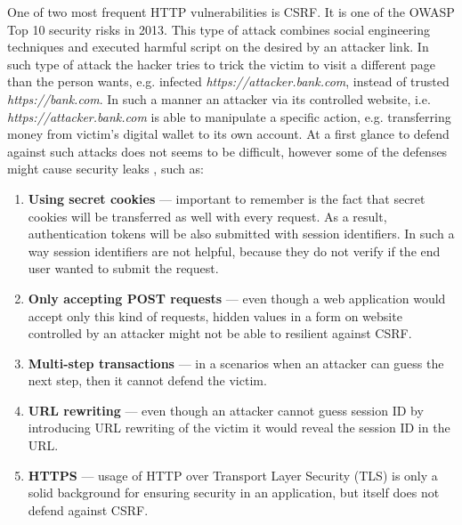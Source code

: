 \documentclass{article} %
\begin{document}
One of two most frequent HTTP vulnerabilities is CSRF. It is one of the OWASP Top 10 security risks in 2013. This type of attack combines social engineering techniques and executed harmful script on the desired by an attacker link. In such type of attack the hacker tries to trick the victim to visit a different page than the person wants, e.g. infected \textit{https://attacker.bank.com}, instead of trusted \textit{https://bank.com}. In such a manner an attacker via its controlled website, i.e. \textit{https://attacker.bank.com} is able to manipulate a specific action, e.g. transferring money from victim's digital wallet to its own account. At a first glance to defend against such attacks does not seems to be difficult, however some of the defenses might cause security leaks \cite{bib:owasp_csrf}, such as:
\begin{enumerate}
    \item \textbf{Using secret cookies} --- important to remember is the fact that secret cookies will be transferred as well with every request. As a result, authentication tokens will be also submitted with session identifiers. In such a way session identifiers are not helpful, because they do not verify if the end user wanted to submit the request.
    \item \textbf{Only accepting POST requests} --- even though a web application would accept only this kind of requests, hidden values in a form on website controlled by an attacker might not be able to resilient against CSRF.
    \item \textbf{Multi-step transactions} --- in a scenarios when an attacker can guess the next step, then it cannot defend the  victim.
    \item \textbf{URL rewriting} --- even though an attacker cannot guess session ID by introducing URL rewriting of the victim it would reveal the session ID in the URL.
    \item \textbf{HTTPS} --- usage of HTTP over Transport Layer Security (TLS) is only a solid background for ensuring security in an application, but itself does not defend against CSRF.
\end{enumerate}
\end{document}
